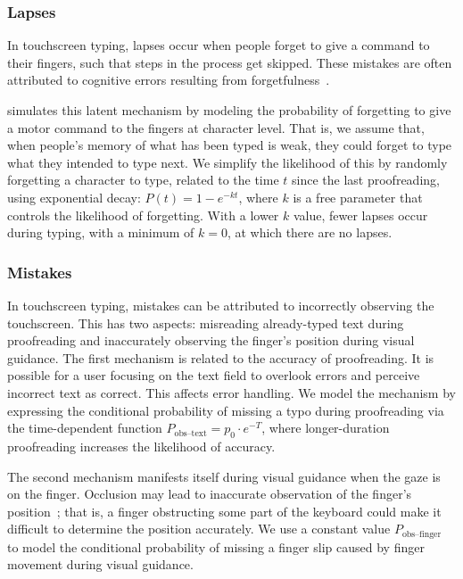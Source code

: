 \subsubsection{Lapses}

In touchscreen typing, lapses occur when people forget to give a command to their fingers, such that steps in the process get skipped. These mistakes are often attributed to cognitive errors resulting from forgetfulness~\cite{nicolau2012elderly}.

\name simulates this latent mechanism by modeling the probability of forgetting to give a motor command to the fingers at character level. That is, we assume that, when people's memory of what has been typed is weak, they could forget to type what they intended to type next.
We simplify the likelihood of this by randomly forgetting a character to type, related to the time $t$ since the last proofreading, using exponential decay: $P(t) = 1 - e^{-kt}$, where $k$ is a free parameter that controls the likelihood of forgetting. With a lower $k$ value, fewer lapses occur during typing, with a minimum of $k = 0$, at which there are no lapses.


\subsubsection{Mistakes}

In touchscreen typing, mistakes can be attributed to incorrectly observing the touchscreen. This has two aspects: misreading already-typed text during proofreading and inaccurately observing the finger's position during visual guidance.
The first mechanism is related to the accuracy of proofreading. It is possible for a user focusing on the text field to overlook errors and perceive incorrect text as correct. This affects error handling. We model the mechanism by expressing the conditional probability of missing a typo during proofreading via the time-dependent function $P_{\text {obs--text}}= p_0 \cdot e^{-T}$, where longer-duration proofreading increases the likelihood of accuracy.

The second mechanism manifests itself during visual guidance when the gaze is on the finger. Occlusion may lead to inaccurate observation of the finger's position~\cite{baudisch2009back}; that is, a finger obstructing some part of the keyboard could make it difficult to determine the position accurately. We use a constant value $P_{\text {obs--finger}}$ to model the conditional probability of missing a finger slip caused by finger movement during visual guidance.

